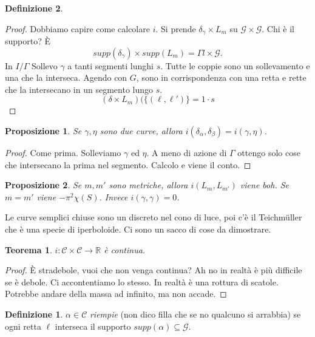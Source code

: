 \documentclass[a4paper]{article}
\newtheorem{theorem}{Teorema}
\newtheorem{proposition}{Proposizione}
\theoremstyle{definition}
\newtheorem{definition}{Definizione}
\begin{document}
\begin{definition}
    \begin{proof}
        Dobbiamo capire come calcolare $i$. Si prende $\delta_{\gamma}  \times L_{m}$ su $\mathcal G \times \mathcal G$. Chi è il supporto? È \[
            supp(\delta_{\gamma} ) \times supp(L_{m}) = \Gamma l \times \mathcal G.
        \]
        In $I / \Gamma$
        Sollevo $\gamma$ a tanti segmenti lunghi $s$. Tutte le coppie sono un sollevamento e una che la interseca. Agendo con $G$, sono in corrispondenza con una retta e rette che la intersecano in un segmento lungo $s$.
        \[
            (\delta \times L_{m} ) (\{(\ell, \ell')\}  = 1 \cdot s
        \]
    \end{proof}

    \begin{proposition}
        Se $\gamma, \eta$ sono due curve, allora $i(\delta_\alpha, \delta_{\beta}) = i(\gamma, \eta)$.
    \end{proposition}

    \begin{proof}
        Come prima. Solleviamo $\gamma$ ed $\eta$. A meno di azione di $\Gamma$ ottengo solo cose che intersecano la prima nel segmento. Calcolo e viene il conto.
    \end{proof}

    \begin{proposition}
        Se $m, m'$ sono metriche, allora $i(L_m, L_{m'})$ viene boh. Se $m = m'$ viene $- \pi^2 \chi(S)$. Invece $i(\gamma,\gamma) = 0$.
    \end{proposition}

    Le curve semplici chiuse sono un discreto nel cono di luce, poi c'è il Teichmüller che è una specie di iperboloide. Ci sono un sacco di cose da dimostrare.

    \begin{theorem}
        $i: \mathcal C \times \mathcal C \to \mathbb R$ è continua.
    \end{theorem}

    \begin{proof}
        È stradebole, vuoi che non venga continua? Ah no in realtà è più difficile se è debole. Ci accontentiamo lo stesso. In realtà è una rottura di scatole. Potrebbe andare della massa ad infinito, ma non accade.
    \end{proof}

    \begin{definition}
        $\alpha \in \mathcal C$ \emph{riempie} (non dico filla che se no qualcuno si arrabbia) se ogni retta $\ell$ interseca il supporto $supp(\alpha) \subseteq \mathcal G$. 
    \end{definition}
    

\end{definition}
\end{document}
